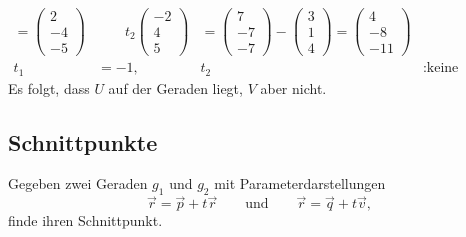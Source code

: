 \begin{beispiel}
\begin{align*}
=
\begin{pmatrix}2\\-4\\-5 \end{pmatrix}
&
\qquad
t_2
\begin{pmatrix}-2\\4\\5\end{pmatrix}
&=
\begin{pmatrix}7\\-7\\-7\end{pmatrix}
-
\begin{pmatrix}3\\1\\4 \end{pmatrix}
=
\begin{pmatrix}4\\-8\\-11\end{pmatrix}
\\
t_1&=-1,&t_2&:\text{keine Lösung.}
\end{align*}
Es folgt, dass $U$ auf der Geraden liegt, $V$ aber nicht.
\end{beispiel}


%
%
\subsection{Schnittpunkte}

\begin{aufgabe}
Gegeben zwei Geraden $g_1$ und $g_2$ mit Parameterdarstellungen
\[
\vec{r} = \vec{p} + t\vec{r}
\qquad\text{und}\qquad
\vec{r} = \vec{q} + t\vec{v},
\]
finde ihren Schnittpunkt.
\end{aufgabe}

